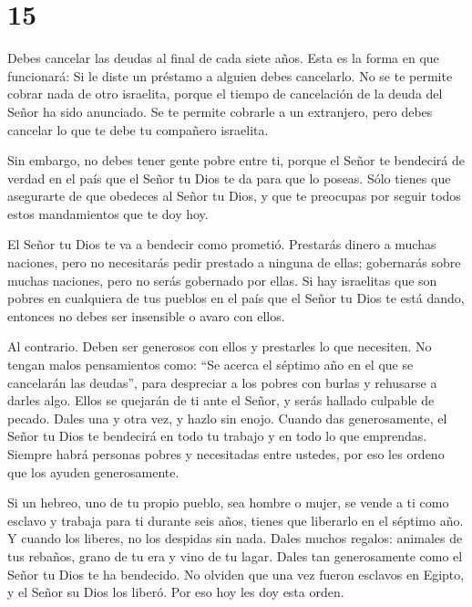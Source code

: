 \hypertarget{section-14}{%
\section{15}\label{section-14}}

 Debes cancelar las deudas al final de cada siete años.
 Esta es la forma en que funcionará: Si le diste un préstamo
a alguien debes cancelarlo. No se te permite cobrar nada de otro
israelita, porque el tiempo de cancelación de la deuda del Señor ha sido
anunciado.  Se te permite cobrarle a un extranjero, pero
debes cancelar lo que te debe tu compañero israelita.

 Sin embargo, no debes tener gente pobre entre ti, porque el
Señor te bendecirá de verdad en el país que el Señor tu Dios te da para
que lo poseas.  Sólo tienes que asegurarte de que obedeces
al Señor tu Dios, y que te preocupas por seguir todos estos mandamientos
que te doy hoy.

 El Señor tu Dios te va a bendecir como prometió. Prestarás
dinero a muchas naciones, pero no necesitarás pedir prestado a ninguna
de ellas; gobernarás sobre muchas naciones, pero no serás gobernado por
ellas.  Si hay israelitas que son pobres en cualquiera de
tus pueblos en el país que el Señor tu Dios te está dando, entonces no
debes ser insensible o avaro con ellos.

 Al contrario. Deben ser generosos con ellos y prestarles lo
que necesiten.  No tengan malos pensamientos como: ``Se
acerca el séptimo año en el que se cancelarán las deudas'', para
despreciar a los pobres con burlas y rehusarse a darles algo. Ellos se
quejarán de ti ante el Señor, y serás hallado culpable de pecado.
 Dales una y otra vez, y hazlo sin enojo. Cuando das
generosamente, el Señor tu Dios te bendecirá en todo tu trabajo y en
todo lo que emprendas.  Siempre habrá personas pobres y
necesitadas entre ustedes, por eso les ordeno que los ayuden
generosamente.

 Si un hebreo, uno de tu propio pueblo, sea hombre o mujer,
se vende a ti como esclavo y trabaja para ti durante seis años, tienes
que liberarlo en el séptimo año.  Y cuando los liberes, no
los despidas sin nada.  Dales muchos regalos: animales de
tus rebaños, grano de tu era y vino de tu lagar. Dales tan generosamente
como el Señor tu Dios te ha bendecido.  No olviden que una
vez fueron esclavos en Egipto, y el Señor su Dios los liberó. Por eso
hoy les doy esta orden.

